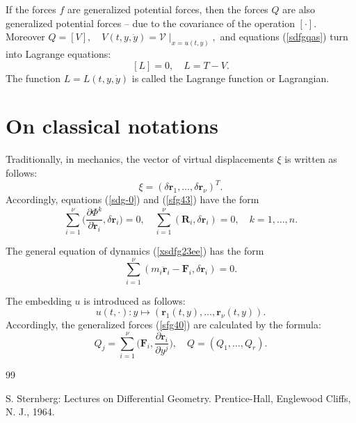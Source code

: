 \documentclass[reqno,12pt]{amsproc}
\newcommand\bs {\boldsymbol}
\begin{document}
If the forces $f$ are generalized potential forces, then the forces $Q$ are also generalized potential forces -- due to the covariance of the operation $[\cdot]$. Moreover
$Q=[V],\quad V(t,y,\dot y)=\mathscr V\mid_{x=u(t,y)},$ and equations (\ref{sdfgqas}) turn into Lagrange equations:
$$[L]=0,\quad L=T-V.$$The function $L=L(t,y,\dot y)$ is called the Lagrange function or Lagrangian.

\section{On classical notations}
Traditionally, in mechanics, the vector of virtual displacements $\xi$ is written as follows:
$$\xi=(\delta \boldsymbol r_1,\ldots,\delta\boldsymbol  r_\nu)^T.$$
Accordingly, equations (\ref{sdg-0}) and (\ref{sfg43}) have the form
$$\sum_{i=1}^\nu\Big(\frac{\partial \Phi^k}{\partial\boldsymbol{\dot r}_i},\delta \boldsymbol r_i\Big)=0,\quad\sum_{i=1}^\nu(\boldsymbol R_i,\delta \boldsymbol r_i)=0,\quad k=1,\ldots,n.$$



The general equation of dynamics (\ref{xsdfg23ee}) has the form
$$\sum_{i=1}^\nu(m_i\boldsymbol{\ddot r}_i-\boldsymbol F_i,\delta\boldsymbol r_i)=0.$$



The embedding $u$ is introduced as follows:
$$u(t,\cdot):y\mapsto (\boldsymbol r_1(t,y),\ldots,\boldsymbol r_\nu(t,y)).$$
Accordingly, the generalized forces (\ref{sfg40})
are calculated by the formula:
$$Q_j=\sum_{i=1}^\nu\Big(\bs F_i,\frac {\partial\bs r_i}{\partial  y^j}\Big),\quad Q=(Q_1,\ldots,Q_r).$$




\begin{thebibliography}{99}

 S. Sternberg: Lectures on Differential Geometry. Prentice-Hall,
Englewood  Cliffs, N. J., 1964.
 \end{thebibliography}
\end{document}
